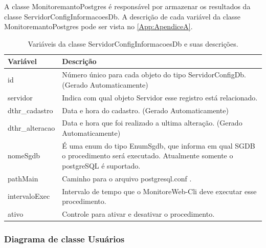 A classe MonitoremantoPostgres é responsável por armazenar os resultados da classe ServidorConfigInformacoesDb. A descrição de cada variável da classe MonitoremantoPostgres pode ser vista no \autoref{App:ApendiceA}.


\begin{table}[H]
\centering
\begin{tabular}{|l|l|}
\hline
{\color[HTML]{000000} \textbf{Variável}} & {\color[HTML]{000000} \textbf{Descrição}}\\ \hline
id                                       & \multicolumn{1}{p{12.50cm}|}{Número único para cada objeto do tipo ServidorConfigDb. (Gerado Automaticamente)} \\ \hline
servidor                                 & \multicolumn{1}{p{12.50cm}|}{Indica com qual objeto Servidor esse registro está relacionado. }\\ \hline
dthr\_cadastro                           & \multicolumn{1}{p{12.50cm}|}{Data e hora do cadastro. (Gerado Automaticamente)}\\ \hline
dthr\_alteracao                          & \multicolumn{1}{p{12.50cm}|}{Data e hora que foi realizado a ultima alteração. (Gerado Automaticamente)}\\ \hline
nomeSgdb                                 & \multicolumn{1}{p{12.50cm}|}{É uma enum do tipo EnumSgdb, que informa em qual SGDB o procedimento será executado. Atualmente somente o postgreSQL é suportado. } \\ \hline
pathMain                                 & \multicolumn{1}{p{12.50cm}|}{Caminho para o arquivo postgresql.conf . }\\ \hline
intervaloExec                            & \multicolumn{1}{p{12.50cm}|}{Intervalo de tempo que o MonitoreWeb-Cli deve executar esse procedimento.} \\ \hline
ativo                                    & \multicolumn{1}{p{12.50cm}|}{Controle para ativar e desativar o procedimento. }\\ \hline
\end{tabular}
\caption[Variáveis da classe ServidorConfigInformacoesDb e suas descrições.]{Variáveis da classe ServidorConfigInformacoesDb e suas descrições.}
\label{Tab:VariaveisServidorConfigInformacoesDb}
\end{table}



\subsubsection{Diagrama de classe Usuários}\label{subsubsec:DiagramaClasseUsuarios}

